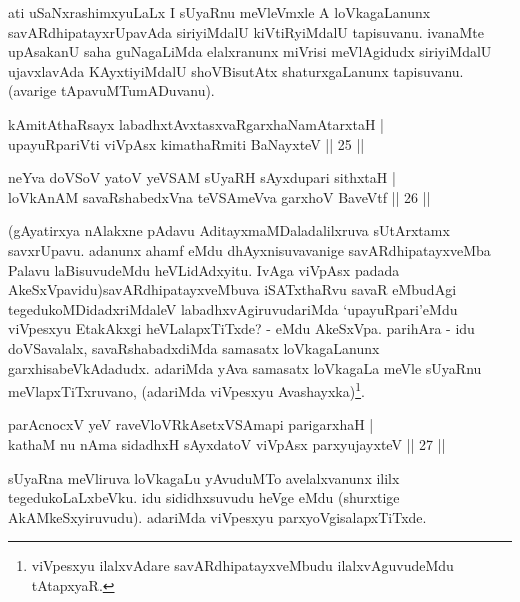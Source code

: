 \begin{artha} 
ati uSaNxrashimxyuLaLx I sUyaRnu meVleVmxle A loVkagaLanunx 
savARdhipatayxrUpavAda siriyiMdalU kiVtiRyiMdalU tapisuvanu. ivanaMte 
upAsakanU saha guNagaLiMda elalxranunx miVrisi meVlAgidudx siriyiMdalU 
ujavxlavAda KAyxtiyiMdalU shoVBisutAtx shaturxgaLanunx tapisuvanu. 
(avarige tApavuMTumADuvanu).
\end{artha}


\begin{shl}
kAmitAthaRsayx labadhxtAvxtasxvaRgarxhaNamAtarxtaH | \\
upayuRpariVti viVpAsx kimathaRmiti BaNayxteV \hfill ||  25 || 
\end{shl}

\begin{shl}
neYva doVSoV yatoV yeVSAM sUyaRH sAyxdupari sithxtaH | \\
loVkAnAM savaRshabedxVna teVSAmeVva garxhoV BaveVtf \hfill ||  26 || 
\end{shl}

\begin{artha} 
(gAyatirxya nAlakxne pAdavu AditayxmaMDaladalilxruva sUtArxtamx 
savxrUpavu. adanunx ahamf eMdu dhAyxnisuvavanige savARdhipatayxveMba 
Palavu laBisuvudeMdu heVLidAdxyitu. IvAga viVpAsx padada 
AkeSxVpavidu)\ndash  savARdhipatayxveMbuva iSATxthaRvu savaR eMbudAgi 
tegedukoMDidadxriMdaleV labadhxvAgiruvudariMda `upayuRpari'\break eMdu 
viVpesxyu EtakAkxgi heVLalapxTiTxde? - eMdu AkeSxVpa. parihAra - idu 
doVSavalalx, savaRshabadxdiMda samasatx loVkagaLanunx 
garxhisabeVkAdadudx. adariMda yAva samasatx loVkagaLa meVle sUyaRnu 
meVlapxTiTxruvano, (adariMda viVpesxyu 
Avashayxka)\footnote{viVpesxyu ilalxvAdare savARdhipatayxveMbudu 
ilalxvAguvudeMdu tAtapxyaR.}.
\end{artha}


\begin{shl}
parAcnocxV yeV raveVloVRkAsetxVSAmapi parigarxhaH | \\
kathaM nu nAma sidadhxH sAyxdatoV viVpAsx parxyujayxteV \hfill ||  27 || 
\end{shl}

\begin{artha} 
sUyaRna meVliruva loVkagaLu yAvuduMTo avelalxvanunx ililx 
tegedukoLaLxbeVku. idu sididhxsuvudu heVge eMdu (shurxtige 
AkAMkeSxyiruvudu). adariMda viVpesxyu parxyoVgisalapxTiTxde.
\end{artha}

